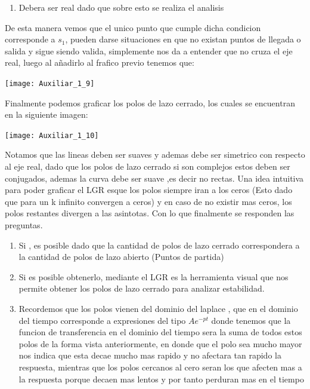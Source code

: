 \documentclass[
  11pt,
  letterpaper,
   addpoints,
   answers
  ]{exam}
\begin{document}
\begin{questions}
\begin{solution}
\begin{enumerate}
    \item Debera ser real dado que sobre esto se realiza el analisis
\end{enumerate}
De esta manera vemos que el unico punto que cumple dicha condicion corresponde a $s_{1}$, pueden darse situaciones en que no existan puntos de llegada o salida y sigue siendo valida, simplemente nos da a entender que no cruza el eje real, luego al añadirlo al frafico previo tenemos que:
\begin{center}
    \texttt{[image: Auxiliar\_1\_9]}
  \end{center}
Finalmente podemos graficar los polos de lazo cerrado, los cuales se encuentran en la siguiente imagen:
\begin{center}
    \texttt{[image: Auxiliar\_1\_10]}
  \end{center}
Notamos que las lineas deben ser suaves y ademas debe ser simetrico con respecto al eje real, dado que los polos de lazo cerrado si son complejos estos deben ser conjugados, ademas la curva debe ser suave ,es decir no rectas. Una idea intuitiva para poder graficar el LGR esque los polos siempre iran a los ceros (Esto dado que para un k infinito convergen a ceros) y en caso de no existir mas ceros, los polos restantes divergen a las asintotas. Con lo que finalmente se responden las preguntas.
\begin{enumerate}
    \item Si , es posible dado que la cantidad de polos de lazo cerrado correspondera a la cantidad de polos de lazo abierto (Puntos de partida)
    \item Si es posible obtenerlo, mediante el LGR es la herramienta visual que nos permite obtener los polos de lazo cerrado para analizar estabilidad.
    \item Recordemos que los polos vienen del dominio del laplace , que en el dominio del tiempo corresponde a expresiones del tipo $Ae^{-pt}$ donde tenemos que la funcion de transferencia en el dominio del tiempo sera la suma de todos estos polos de la forma vista anteriormente, en donde que el polo sea mucho mayor nos indica que esta decae mucho mas rapido y no afectara tan rapido la respuesta,  mientras que los polos cercanos al cero seran los que afecten mas a la respuesta porque decaen mas lentos y por tanto perduran mas en el tiempo
\end{enumerate}


\end{solution}


\end{questions}
\newpage
\end{document}
